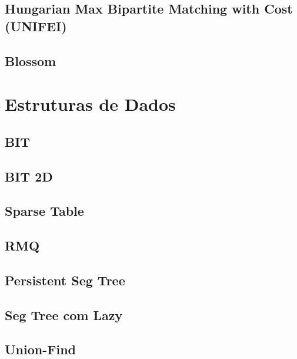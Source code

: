 \subsection{Hungarian Max Bipartite Matching with Cost (UNIFEI)}
\raggedbottom
\hrulefill
\subsection{Blossom}
\raggedbottom
\hrulefill

\section{Estruturas de Dados}
\subsection{BIT}
\raggedbottom
\hrulefill
\subsection{BIT 2D}
\raggedbottom
\hrulefill
\subsection{Sparse Table}
\raggedbottom
\hrulefill
\subsection{RMQ}
\raggedbottom
\hrulefill
\subsection{Persistent Seg Tree}
\raggedbottom
\hrulefill
\subsection{Seg Tree com Lazy}
\raggedbottom
\hrulefill
\subsection{Union-Find}
\raggedbottom
\hrulefill
